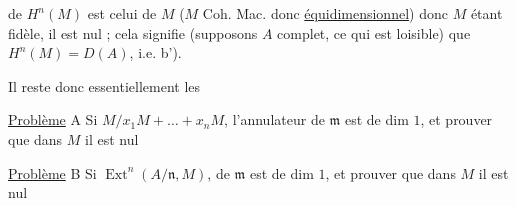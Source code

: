    de $H^n(M)$ est celui de $M$ ($M$ Coh. Mac. donc \uline{équidimensionnel}) donc $M$ étant fidèle, il est nul ; cela signifie (supposons $A$ complet, ce qui est loisible) que $H^n(M)=D(A)$, i.e. b').

 Il reste donc essentiellement les

\uline{Problème} A Si  $M/x_1M+\ldots+x_nM$, l'annulateur de $\mathfrak m$ est de dim $1$, et  prouver que dans $M$ il est nul

\uline{Problème} B Si  $\operatorname{Ext}^n(A/\mathfrak n,M)$,  de $\mathfrak m$ est de dim $1$, et  prouver que dans $M$  il est nul

